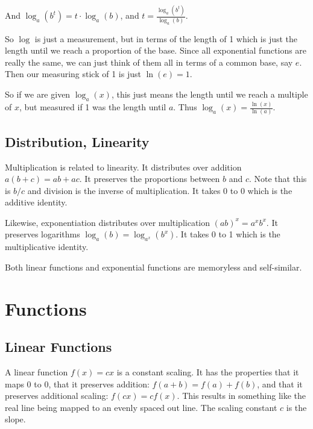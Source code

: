 \documentclass[../main.tex]{subfiles}
\begin{document}
And \( \log_a(b^t) = t \cdot \log_a(b) \), and \( t = \frac{\log_a(b^t)}{\log_a(b)} \).




So \( \log \) is just a measurement, but in terms of the length of 1
which is just the length until we reach a proportion of the base.
Since all exponential functions are really the same,
we can just think of them all in terms of a common base, say \( e \).
Then our measuring stick of 1 is just \( \ln(e) = 1\).

So if we are given \( \log_a(x) \), this just means
the length until we reach a multiple of \( x \),
but measured if 1 was the length until \( a \).
Thus \( \log_a(x) = \frac{\ln(x)}{\ln(a)} \).


\subsection{Distribution, Linearity}

Multiplication is related to linearity.
It distributes over addition \( a(b + c) = ab + ac \).
It preserves the proportions between \( b \) and \( c \).
Note that this is \( b/c \) and division is the inverse of multiplication.
It takes 0 to 0 which is the additive identity.

Likewise, exponentiation distributes over multiplication
\( (ab)^x = a^x b^x \).
It preserves logarithms \( \log_a(b) = \log_{a^x}(b^x) \).
It takes 0 to 1 which is the multiplicative identity.

Both linear functions and exponential functions are memoryless and self-similar.


\newpage
\section{Functions}

\subsection{Linear Functions}

A linear function \( f(x) = cx \) is a constant scaling.
It has the properties that it maps 0 to 0,
that it preserves addition: \( f(a+b) = f(a) + f(b) \),
and that it preserves additional scaling: \( f(cx) = cf(x) \).
This results in something like the real line being mapped to an evenly spaced out line.
The scaling constant \( c \) is the slope.


\end{document}
